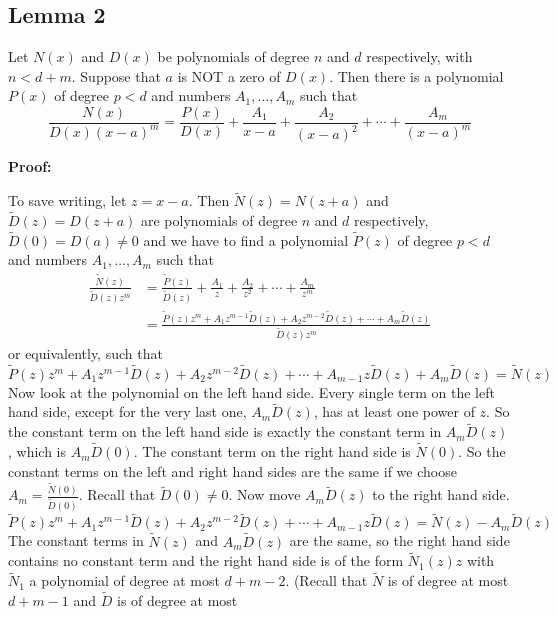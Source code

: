 \subsection{Lemma 2}
Let \(N(x)\) and \(D(x)\) be polynomials of degree \(n\) and \(d\) respectively, with \(n < d + m\).
Suppose that \(a\) is NOT a zero of \(D(x)\). Then there is a polynomial \(P(x)\) of degree \(p < d\) and
numbers \(A_1, \dots, A_m\) such that
\[
\frac{N(x)}{D(x) {(x-a)}^m} = \frac{P(x)}{D(x)} + \frac{A_1}{x-a} + \frac{A_2}{{(x-a)}^2} + \cdots + \frac{A_m}{{(x-a)}^m}
\]

\textbf{Proof:} 

To save writing, let \(z = x - a\). Then \(\tilde{N}(z) = N(z + a)\) and \(\tilde{D}(z) = D(z + a)\)
are polynomials of degree \(n\) and \(d\) respectively, \(\tilde{D}(0) = D(a) \neq 0\) and we have to find a
polynomial \(\tilde{P}(z)\) of degree \(p < d\) and numbers \(A_1, \dots, A_m\) such that
\begin{align*}
\frac{\tilde{N}(z)}{\tilde{D}(z) z^m} &= \frac{\tilde{P}(z)}{\tilde{D}(z)} + \frac{A_1}{z} + \frac{A_2}{z^2} + \cdots + \frac{A_m}{z^m} \\
&= \frac{\tilde{P}(z) z^m + A_1 z^{m-1} \tilde{D}(z) + A_2 z^{m-2} \tilde{D}(z) + \cdots + A_m \tilde{D}(z)}{\tilde{D}(z) z^m}
\end{align*}
or equivalently, such that
\[
\tilde{P}(z)z^m + A_1 z^{m-1} \tilde{D}(z) + A_2 z^{m-2} \tilde{D}(z) + \cdots + A_{m-1} z \tilde{D}(z) + A_m \tilde{D}(z) = \tilde{N}(z)
\]
Now look at the polynomial on the left hand side. Every single term on the left hand side,
except for the very last one, \(A_m \tilde{D}(z)\), has at least one power of \(z\). So the constant term on
the left hand side is exactly the constant term in \(A_m \tilde{D}(z)\), which is \(A_m \tilde{D}(0)\). The constant
term on the right hand side is \(\tilde{N}(0)\). So the constant terms on the left and right hand sides
are the same if we choose \(A_m = \frac{\tilde{N}(0)}{\tilde{D}(0)}\). Recall that \(\tilde{D}(0) \neq 0\). Now move \(A_m \tilde{D}(z)\) to the right
hand side.
\[
\tilde{P}(z)z^m + A_1 z^{m-1} \tilde{D}(z) + A_2 z^{m-2} \tilde{D}(z) + \cdots + A_{m-1} z \tilde{D}(z) = \tilde{N}(z) - A_m \tilde{D}(z)
\]
The constant terms in \(\tilde{N}(z)\) and \(A_m \tilde{D}(z)\) are the same, so the right hand side contains no
constant term and the right hand side is of the form \(\tilde{N}_1(z)z\) with \(\tilde{N}_1\) a polynomial of degree
at most \(d + m - 2\). (Recall that \(\tilde{N}\) is of degree at most \(d + m - 1\) and \(\tilde{D}\) is of degree at most
